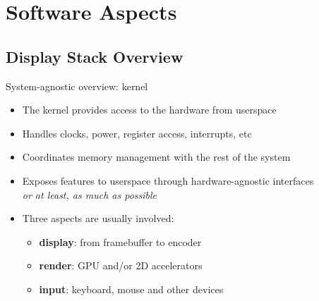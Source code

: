 \section{Software Aspects}

\subsection{Display Stack Overview}

\begin{frame}{System-agnostic overview: kernel}
  \begin{itemize}
  \item The kernel provides access to the hardware from userspace
  \item Handles clocks, power, register access, interrupts, etc
  \item Coordinates memory management with the rest of the system
  \item Exposes features to userspace through hardware-agnostic interfaces\\
  \textit{or at least, as much as possible}
  \item Three aspects are usually involved:
    \begin{itemize}
    \item \textbf{display}: from framebuffer to encoder
    \item \textbf{render}: GPU and/or 2D accelerators
    \item \textbf{input}: keyboard, mouse and other devices
    \end{itemize}
  \end{itemize}
\end{frame}

